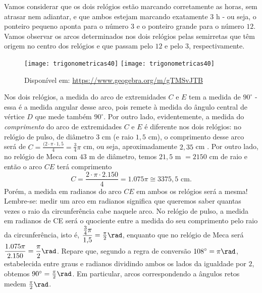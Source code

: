 Vamos considerar que os dois relógios estão marcando corretamente as horas, sem atrasar nem adiantar, e que ambos estejam marcando exatamente $3$ h - ou seja, o ponteiro pequeno aponta para o número $3$ e o ponteiro grande para o número $12$. Vamos observar os arcos determinados nos dois relógios pelas semirretas que têm origem no centro dos relógios e que passam pelo $12$ e pelo $3$, respectivamente.

\begin{figure}[H]
\centering

\texttt{[image: trigonometricas40]}
\hspace{2em}
\texttt{[image: trigonometricas40]}
\caption{Disponível em: \url{https://www.geogebra.org/m/gTMSvJTB}}

\end{figure}

Nos dois relógios, a medida do arco de extremidades $C$ e $E$ tem a medida de $90^{\circ}$ - essa é a medida angular desse arco, pois remete à medida do ângulo central de vértice $D$ que mede também $90^{\circ}$. Por outro lado, evidentemente, a medida do \textit{comprimento} do arco de extremidades $C$ e $E$ é diferente nos dois relógios: no relógio de pulso, de diâmetro $3$ cm (e raio $1{,}5$ cm), o comprimento desse arco será de $C=\frac{(2\cdot\pi\cdot1{,}5}{4}=\frac{3}{4}\pi$ cm, ou seja, aproximadamente $2{,}35$ cm . Por outro lado, no relógio de Meca com $43$ m de diâmetro, temos $21{,}5\text{ m } = 2150$ cm de raio e então o arco $CE$ terá comprimento  
\begin{equation*}
C=\dfrac{2\cdot\pi\cdot2.150}{4}=1.075\pi\cong3375{,}5\text{ cm}.
\end{equation*}
Porém, a medida em radianos do arco $CE$ em ambos os relógios será a mesma! Lembre-se: medir um arco em radianos significa que queremos saber quantas vezes o raio da circunferência cabe naquele arco. No relógio de pulso, a medida em radianos de CE será o quociente entre a medida do seu comprimento pelo raio da circunferência, isto é, $\dfrac{\frac{3}{4}\pi}{1{,}5}=\frac{\pi}{2}\rad$, enquanto que no relógio de Meca será $\dfrac{1.075\pi}{2.150}=\dfrac{\pi}{2}\rad$. Repare que, segundo a regra de conversão $108^{\circ}=\pi\rad$, estabelecida entre graus e radianos dividindo ambos os lados da igualdade por $2$, obtemos $90^{\circ}=\frac{\pi}{2}\rad$. Em particular, arcos correspondendo a ângulos retos medem $\frac{\pi}{2}\rad$.

